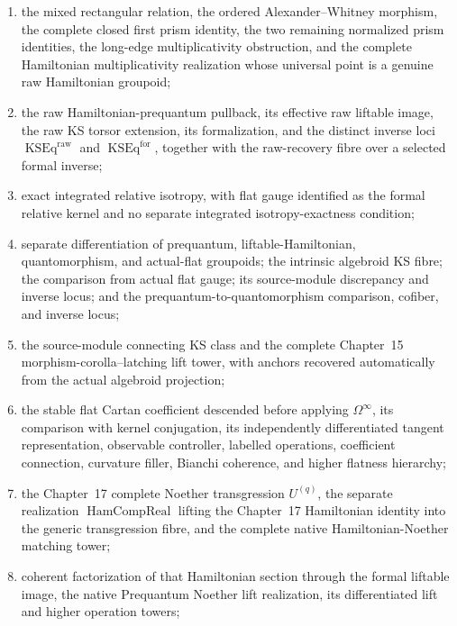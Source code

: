 \begin{enumerate}
      any implicit relation-level presentation of a generic complete closed coefficient
      or of its selected closed class;
\item the mixed rectangular relation, the ordered Alexander--Whitney morphism, the
      complete closed first prism identity, the two remaining normalized prism
      identities, the long-edge multiplicativity obstruction, and the complete
      Hamiltonian multiplicativity realization whose universal point is a genuine
      raw Hamiltonian groupoid;
\item the raw Hamiltonian-prequantum pullback, its effective raw liftable image,
      the raw KS torsor extension, its formalization, and the distinct inverse loci
      $\operatorname{KSEq}^{\mathrm{raw}}$ and
      $\operatorname{KSEq}^{\mathrm{for}}$, together with the raw-recovery fibre
      over a selected formal inverse;
\item exact integrated relative isotropy, with flat gauge identified as the formal
      relative kernel and no separate integrated isotropy-exactness condition;
\item separate differentiation of prequantum, liftable-Hamiltonian, quantomorphism,
      and actual-flat groupoids; the intrinsic algebroid KS fibre; the comparison
      from actual flat gauge; its source-module discrepancy and inverse locus; and
      the prequantum-to-quantomorphism comparison, cofiber, and inverse locus;
\item the source-module connecting KS class and the complete Chapter~15
      morphism-corolla--latching lift tower, with anchors recovered automatically
      from the actual algebroid projection;
\item the stable flat Cartan coefficient descended before applying
      $\Omega^\infty$, its comparison with kernel conjugation, its independently
      differentiated tangent representation, observable controller, labelled
      operations, coefficient connection, curvature filler, Bianchi coherence,
      and higher flatness hierarchy;
\item the Chapter~17 complete Noether transgression $U^{(q)}$, the separate
      realization $\operatorname{HamCompReal}$ lifting the Chapter~17 Hamiltonian
      identity into the generic transgression fibre, and the complete native
      Hamiltonian-Noether matching tower;
\item coherent factorization of that Hamiltonian section through the formal
      liftable image, the native Prequantum Noether lift realization, its
      differentiated lift and higher operation towers;

\end{enumerate}
